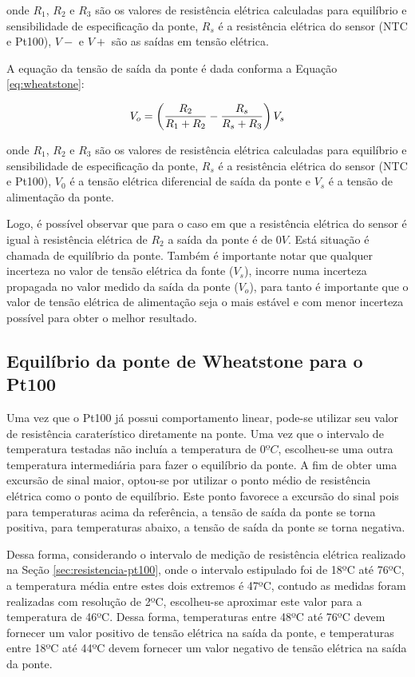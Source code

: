 \documentclass[a4paper]{instrumentacao}
\begin{document}
\noindent onde $R_1$, $R_2$ e $R_3$ são os valores de resistência elétrica calculadas para equilíbrio e sensibilidade de especificação da ponte, $R_s$ é a resistência elétrica do sensor (NTC e Pt100), $V-$ e $V+$ são as saídas em tensão elétrica.

A equação da tensão de saída da ponte é dada conforma a Equação \ref{eq:wheatstone}:

\begin{equation}
	V_o = \left({{R_2}\over{R_1 + R_2}} - {{R_s}\over{R_s + R_3}}\right)V_s
	\label{eq:wheatstone}
\end{equation}

\noindent onde $R_1$, $R_2$ e $R_3$ são os valores de resistência elétrica calculadas para equilíbrio e sensibilidade de especificação da ponte, $R_s$ é a resistência elétrica do sensor (NTC e Pt100), $V_0$ é a tensão elétrica diferencial de saída da ponte e $V_s$ é a tensão de alimentação da ponte.

Logo, é possível observar que para o caso em que a resistência elétrica do sensor é igual à resistência elétrica de $R_2$ a saída da ponte é de $0V$. Está situação é chamada de equilíbrio da ponte. Também é importante notar que qualquer incerteza no valor de tensão elétrica da fonte ($V_s$), incorre numa incerteza propagada no valor medido da saída da ponte ($V_o$), para tanto é importante que o valor de tensão elétrica de alimentação seja o mais estável e com menor incerteza possível para obter o melhor resultado.

\subsection{Equilíbrio da ponte de Wheatstone para o Pt100}
\label{ssec:equilibrio-ponte-pt100}
Uma vez que o Pt100 já possui comportamento linear, pode-se utilizar seu valor de resistência caraterístico diretamente na ponte. Uma vez que o intervalo de temperatura testadas não incluía a temperatura de $0ºC$, escolheu-se uma outra temperatura intermediária para fazer o equilíbrio da ponte. A fim de obter uma excursão de sinal maior, optou-se por utilizar o ponto médio de resistência elétrica como o ponto de equilíbrio. Este ponto favorece a excursão do sinal pois para temperaturas acima da referência, a tensão de saída da ponte se torna positiva, para temperaturas abaixo, a tensão de saída da ponte se torna negativa.

Dessa forma, considerando o intervalo de medição de resistência elétrica realizado na Seção \ref{sec:resistencia-pt100}, onde o intervalo estipulado foi de 18ºC até 76ºC, a temperatura média entre estes dois extremos é 47ºC, contudo as medidas foram realizadas com resolução de 2ºC, escolheu-se aproximar este valor para a temperatura de 46ºC. Dessa forma, temperaturas entre 48ºC até 76ºC devem fornecer um valor positivo de tensão elétrica na saída da ponte, e temperaturas entre 18ºC até 44ºC devem fornecer um valor negativo de tensão elétrica na saída da ponte.
\end{document}

